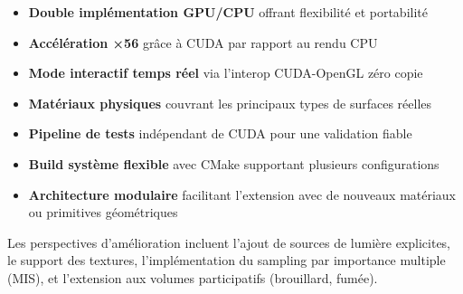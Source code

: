 \documentclass[12pt,a4paper]{article}
\begin{document}
\begin{itemize}
    \item \textbf{Double implémentation GPU/CPU} offrant flexibilité et portabilité
    \item \textbf{Accélération ×56} grâce à CUDA par rapport au rendu CPU
    \item \textbf{Mode interactif temps réel} via l'interop CUDA-OpenGL zéro copie
    \item \textbf{Matériaux physiques} couvrant les principaux types de surfaces réelles
    \item \textbf{Pipeline de tests} indépendant de CUDA pour une validation fiable
    \item \textbf{Build système flexible} avec CMake supportant plusieurs configurations
    \item \textbf{Architecture modulaire} facilitant l'extension avec de nouveaux
    matériaux ou primitives géométriques
\end{itemize}

Les perspectives d'amélioration incluent l'ajout de sources de lumière explicites,
le support des textures, l'implémentation du sampling par importance multiple (MIS),
et l'extension aux volumes participatifs (brouillard, fumée).

\end{document}
